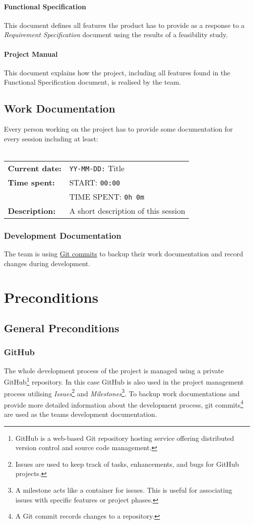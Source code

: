 \documentclass[11pt]{article}
\begin{document}
\paragraph{Functional Specification} This document defines all features the product has to provide as a response to a \textit{Requirement Specification} document using the results of a feasibility study.
\paragraph{Project Manual} This document explains how the project, including all features found in the Functional Specification document, is realised by the team.

\subsection{Work Documentation}
Every person working on the project has to provide some documentation for every session including at least:
\\
\\
\begin{tabular}{ll}
 \textbf{Current date:} & \texttt{YY-MM-DD:} Title\\
 \textbf{Time spent:} & START: \texttt{00:00}\\
 & TIME SPENT: \texttt{0h 0m}\\
 \textbf{Description:} & A short description of this session
\end{tabular}

\subsubsection{Development Documentation}
The team is using \hyperref[subsubsec:github]{Git commits} to backup their work documentation and record changes during development.

\section{Preconditions}
\subsection{General Preconditions}
\subsubsection{GitHub}\label{subsubsec:github}
The whole development process of the project is managed using a private GitHub\footnote{GitHub is a web-based Git repository hosting service offering distributed version control and source code management.} repository.
In this case GitHub is also used in the project management process utilising \textit{Issues}\footnote{Issues are used to keep track of tasks, enhancements, and bugs for GitHub projects.} and \textit{Milestones}\footnote{A milestone acts like a container for issues. This is useful for associating issues with specific features or project phases.}.
To backup work documentations and provide more detailed information about the development process, git commits\footnote{A Git commit records changes to a repository.} are used as the teams development documentation.
\end{document}
